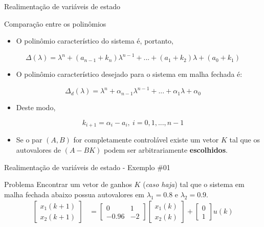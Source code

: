 \begin{frame}{Realimentação de variáveis de estado}
\begin{block}{Comparação entre os polinômios}
\begin{itemize}
    \item O polinômio característico do sistema é, portanto,
\end{itemize}
$$\Delta(\lambda) = \lambda^n + (a_{n-1}+k_n)\lambda^{n-1} + ... + (a_1+k_2)\lambda + (a_0+k_1)$$
\vspace{-0.3cm}
\begin{itemize}
    \item O polinômio característico desejado para o sistema em malha fechada é:
\end{itemize}
$$\Delta_d(\lambda) = \lambda^n + \alpha_{n-1}\lambda^{n-1} + ... + \alpha_1\lambda + \alpha_0$$
\vspace{-0.3cm}
\begin{itemize}
    \item Deste modo,
\end{itemize}
$$k_{i+1} = \alpha_i - a_i, \ i=0,1,...,n-1$$
\begin{itemize}
    \item Se o par $(A,B)$ for completamente controlável existe um vetor $K$ tal que os autovalores de $(A-BK)$ podem ser arbitrariamente \textbf{escolhidos}.
\end{itemize}
\end{block}
\end{frame}

\begin{frame}{Realimentação de variáveis de estado - Exemplo \#01}
\begin{block}{Problema}
	Encontrar um vetor de ganhos $K$ (\textit{caso haja}) tal que o sistema em malha fechada abaixo possua autovalores em $\lambda_1 = \num{0,8}$ e $\lambda_2 = \num{0,9}$.
	\begin{align*}
	\begin{bmatrix} x_1(k+1) \\ x_2(k+1) \end{bmatrix}
	&=
	\begin{bmatrix}
	0 & 1 \\ -\num{0,96} & -2
	\end{bmatrix}
	\begin{bmatrix}
	x_1(k) \\ x_2(k)
	\end{bmatrix}
	+
	\begin{bmatrix}
	0 \\ 1
	\end{bmatrix}
	u(k)
	\end{align*}
\end{block}
\end{frame}

